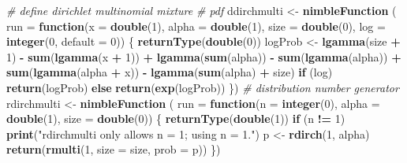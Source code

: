 \documentclass[
]{article}
\newenvironment{Shaded}{\begin{snugshade}}{\end{snugshade}}
\newcommand{\AttributeTok}[1]{\textcolor[rgb]{0.13,0.29,0.53}{#1}}
\newcommand{\CommentTok}[1]{\textcolor[rgb]{0.56,0.35,0.01}{\textit{#1}}}
\newcommand{\ControlFlowTok}[1]{\textcolor[rgb]{0.13,0.29,0.53}{\textbf{#1}}}
\newcommand{\DecValTok}[1]{\textcolor[rgb]{0.00,0.00,0.81}{#1}}
\newcommand{\FunctionTok}[1]{\textcolor[rgb]{0.13,0.29,0.53}{\textbf{#1}}}
\newcommand{\NormalTok}[1]{#1}
\newcommand{\OtherTok}[1]{\textcolor[rgb]{0.56,0.35,0.01}{#1}}
\newcommand{\SpecialCharTok}[1]{\textcolor[rgb]{0.81,0.36,0.00}{\textbf{#1}}}
\newcommand{\StringTok}[1]{\textcolor[rgb]{0.31,0.60,0.02}{#1}}
\begin{document}
\begin{Shaded}
\begin{Highlighting}[]
  \CommentTok{\# define dirichlet multinomial mixture}
  \CommentTok{\# pdf}
\NormalTok{  ddirchmulti }\OtherTok{\textless{}{-}} \FunctionTok{nimbleFunction}\NormalTok{ (}
    \AttributeTok{run =} \ControlFlowTok{function}\NormalTok{(}\AttributeTok{x =} \FunctionTok{double}\NormalTok{(}\DecValTok{1}\NormalTok{), }\AttributeTok{alpha =} \FunctionTok{double}\NormalTok{(}\DecValTok{1}\NormalTok{), }\AttributeTok{size =} \FunctionTok{double}\NormalTok{(}\DecValTok{0}\NormalTok{),}
                   \AttributeTok{log =} \FunctionTok{integer}\NormalTok{(}\DecValTok{0}\NormalTok{, }\AttributeTok{default =} \DecValTok{0}\NormalTok{)) \{}
      \FunctionTok{returnType}\NormalTok{(}\FunctionTok{double}\NormalTok{(}\DecValTok{0}\NormalTok{))}
\NormalTok{      logProb }\OtherTok{\textless{}{-}} \FunctionTok{lgamma}\NormalTok{(size }\SpecialCharTok{+} \DecValTok{1}\NormalTok{) }\SpecialCharTok{{-}} \FunctionTok{sum}\NormalTok{(}\FunctionTok{lgamma}\NormalTok{(x }\SpecialCharTok{+} \DecValTok{1}\NormalTok{)) }\SpecialCharTok{+} \FunctionTok{lgamma}\NormalTok{(}\FunctionTok{sum}\NormalTok{(alpha)) }\SpecialCharTok{{-}}
        \FunctionTok{sum}\NormalTok{(}\FunctionTok{lgamma}\NormalTok{(alpha)) }\SpecialCharTok{+} \FunctionTok{sum}\NormalTok{(}\FunctionTok{lgamma}\NormalTok{(alpha }\SpecialCharTok{+}\NormalTok{ x)) }\SpecialCharTok{{-}}
        \FunctionTok{lgamma}\NormalTok{(}\FunctionTok{sum}\NormalTok{(alpha) }\SpecialCharTok{+}\NormalTok{ size)}
      \ControlFlowTok{if}\NormalTok{ (log) }\FunctionTok{return}\NormalTok{(logProb)}
      \ControlFlowTok{else} \FunctionTok{return}\NormalTok{(}\FunctionTok{exp}\NormalTok{(logProb))}
\NormalTok{    \})}
  \CommentTok{\# distribution number generator}
\NormalTok{  rdirchmulti }\OtherTok{\textless{}{-}} \FunctionTok{nimbleFunction}\NormalTok{ (}
    \AttributeTok{run =} \ControlFlowTok{function}\NormalTok{(}\AttributeTok{n =} \FunctionTok{integer}\NormalTok{(}\DecValTok{0}\NormalTok{), }\AttributeTok{alpha =} \FunctionTok{double}\NormalTok{(}\DecValTok{1}\NormalTok{), }\AttributeTok{size =} \FunctionTok{double}\NormalTok{(}\DecValTok{0}\NormalTok{)) \{}
      \FunctionTok{returnType}\NormalTok{(}\FunctionTok{double}\NormalTok{(}\DecValTok{1}\NormalTok{))}
      \ControlFlowTok{if}\NormalTok{ (n }\SpecialCharTok{!=} \DecValTok{1}\NormalTok{) }\FunctionTok{print}\NormalTok{(}\StringTok{"rdirchmulti only allows n = 1; using n = 1."}\NormalTok{)}
\NormalTok{      p }\OtherTok{\textless{}{-}} \FunctionTok{rdirch}\NormalTok{(}\DecValTok{1}\NormalTok{, alpha)}
      \FunctionTok{return}\NormalTok{(}\FunctionTok{rmulti}\NormalTok{(}\DecValTok{1}\NormalTok{, }\AttributeTok{size =}\NormalTok{ size, }\AttributeTok{prob =}\NormalTok{ p))}
\NormalTok{    \})}
  

\end{Highlighting}
\end{Shaded}
\end{document}
